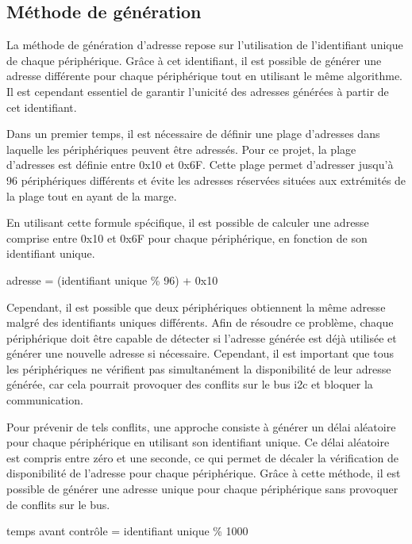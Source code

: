 \subsection{Méthode de génération}

La méthode de génération d'adresse repose sur l'utilisation de l'identifiant unique de chaque périphérique.
Grâce à cet identifiant, il est possible de générer une adresse différente pour chaque périphérique tout en utilisant le même algorithme.
Il est cependant essentiel de garantir l'unicité des adresses générées à partir de cet identifiant.

Dans un premier temps, il est nécessaire de définir une plage d'adresses dans laquelle les périphériques peuvent être adressés.
Pour ce projet, la plage d'adresses est définie entre 0x10 et 0x6F.
Cette plage permet d'adresser jusqu'à 96 périphériques différents et évite les adresses réservées situées aux extrémités de la plage tout en ayant de la marge.

En utilisant cette formule spécifique, il est possible de calculer une adresse comprise entre 0x10 et 0x6F pour chaque périphérique, en fonction de son identifiant unique.

\begin{center}
    adresse = (identifiant unique \% 96) + 0x10
\end{center}

Cependant, il est possible que deux périphériques obtiennent la même adresse malgré des identifiants uniques différents.
Afin de résoudre ce problème, chaque périphérique doit être capable de détecter si l'adresse générée est déjà utilisée et générer une nouvelle adresse si nécessaire.
Cependant, il est important que tous les périphériques ne vérifient pas simultanément la disponibilité de leur adresse générée, car cela pourrait provoquer des conflits sur le bus \gls{i2c} et bloquer la communication.

Pour prévenir de tels conflits, une approche consiste à générer un délai aléatoire pour chaque périphérique en utilisant son identifiant unique.
Ce délai aléatoire est compris entre zéro et une seconde, ce qui permet de décaler la vérification de disponibilité de l'adresse pour chaque périphérique.
Grâce à cette méthode, il est possible de générer une adresse unique pour chaque périphérique sans provoquer de conflits sur le bus.

\begin{center}
    temps avant contrôle = identifiant unique \% 1000
\end{center}

